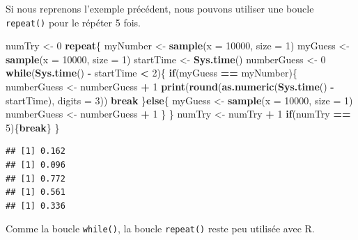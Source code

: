\documentclass[]{book}
\newenvironment{Shaded}{\begin{snugshade}}{\end{snugshade}}
\newcommand{\ControlFlowTok}[1]{\textcolor[rgb]{0.13,0.29,0.53}{\textbf{#1}}}
\newcommand{\DataTypeTok}[1]{\textcolor[rgb]{0.13,0.29,0.53}{#1}}
\newcommand{\DecValTok}[1]{\textcolor[rgb]{0.00,0.00,0.81}{#1}}
\newcommand{\KeywordTok}[1]{\textcolor[rgb]{0.13,0.29,0.53}{\textbf{#1}}}
\newcommand{\NormalTok}[1]{#1}
\newcommand{\OperatorTok}[1]{\textcolor[rgb]{0.81,0.36,0.00}{\textbf{#1}}}
\newcommand{\StringTok}[1]{\textcolor[rgb]{0.31,0.60,0.02}{#1}}
\begin{document}
Si nous reprenons l'exemple précédent, nous pouvons utiliser une boucle \texttt{repeat()} pour le répéter 5 fois.

\begin{Shaded}
\begin{Highlighting}[]
\NormalTok{numTry <-}\StringTok{ }\DecValTok{0}
\ControlFlowTok{repeat}\NormalTok{\{}
\NormalTok{  myNumber <-}\StringTok{ }\KeywordTok{sample}\NormalTok{(}\DataTypeTok{x =} \DecValTok{10000}\NormalTok{, }\DataTypeTok{size =} \DecValTok{1}\NormalTok{)}
\NormalTok{  myGuess <-}\StringTok{ }\KeywordTok{sample}\NormalTok{(}\DataTypeTok{x =} \DecValTok{10000}\NormalTok{, }\DataTypeTok{size =} \DecValTok{1}\NormalTok{)}
\NormalTok{  startTime <-}\StringTok{ }\KeywordTok{Sys.time}\NormalTok{()}
\NormalTok{  numberGuess <-}\StringTok{ }\DecValTok{0}
  \ControlFlowTok{while}\NormalTok{(}\KeywordTok{Sys.time}\NormalTok{() }\OperatorTok{-}\StringTok{ }\NormalTok{startTime }\OperatorTok{<}\StringTok{ }\DecValTok{2}\NormalTok{)\{}
    \ControlFlowTok{if}\NormalTok{(myGuess }\OperatorTok{==}\StringTok{ }\NormalTok{myNumber)\{}
\NormalTok{      numberGuess <-}\StringTok{ }\NormalTok{numberGuess }\OperatorTok{+}\StringTok{ }\DecValTok{1}
      \KeywordTok{print}\NormalTok{(}\KeywordTok{round}\NormalTok{(}\KeywordTok{as.numeric}\NormalTok{(}\KeywordTok{Sys.time}\NormalTok{() }\OperatorTok{-}\StringTok{ }\NormalTok{startTime), }\DataTypeTok{digits =} \DecValTok{3}\NormalTok{))}
      \ControlFlowTok{break}
\NormalTok{    \}}\ControlFlowTok{else}\NormalTok{\{}
\NormalTok{      myGuess <-}\StringTok{ }\KeywordTok{sample}\NormalTok{(}\DataTypeTok{x =} \DecValTok{10000}\NormalTok{, }\DataTypeTok{size =} \DecValTok{1}\NormalTok{)}
\NormalTok{      numberGuess <-}\StringTok{ }\NormalTok{numberGuess }\OperatorTok{+}\StringTok{ }\DecValTok{1}
\NormalTok{    \}}
\NormalTok{  \}}
\NormalTok{  numTry <-}\StringTok{ }\NormalTok{numTry }\OperatorTok{+}\StringTok{ }\DecValTok{1}
  \ControlFlowTok{if}\NormalTok{(numTry }\OperatorTok{==}\StringTok{ }\DecValTok{5}\NormalTok{)\{}\ControlFlowTok{break}\NormalTok{\}}
\NormalTok{\}}
\end{Highlighting}
\end{Shaded}

\begin{verbatim}
## [1] 0.162
## [1] 0.096
## [1] 0.772
## [1] 0.561
## [1] 0.336
\end{verbatim}

Comme la boucle \texttt{while()}, la boucle \texttt{repeat()} reste peu utilisée avec R.
\end{document}
